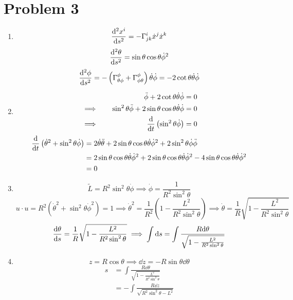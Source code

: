 \documentclass[12pt]{article}
\newcommand{\chrissym}[3]{\Gamma_{#2#3}^#1}
\begin{document}
\section*{Problem 3}
\begin{enumerate}[label=(\alph*)]
    \item 
    \[ \dv[2]{x^i}{s} = -\chrissym{i}{j}{k}\dot{x}^j\dot{x}^k \]
    \[ \dv[2]{\theta}{s} = \sin\theta\cos\theta\dot{\phi}^2 \]
    \[ \dv[2]{\phi}{s} = -\left(\chrissym{\phi}{\theta}{\phi}+\chrissym{\phi}{\phi}{\theta}\right)\dot{\theta}\dot{\phi} = -2\cot\theta\dot{\theta}\dot{\phi} \]
    \item
    \begin{alignat*}{3}
        &         \quad & \ddot{\phi} + 2\cot\theta\dot{\theta}\dot{\phi} &= 0  \\
        &\implies \quad & \sin^2\theta\ddot{\phi} + 2\sin\theta\cos\theta\dot{\theta}\dot{\phi} &= 0 \\
        &\implies \quad & \dv{t}\left(\sin^2\theta\dot{\phi}\right) &= 0 \\
    \end{alignat*}
    \begin{align*}
        \dv{t}\left(\dot{\theta}^2 + \sin^2\theta\dot{\phi}\right) &= 2\dot{\theta}\ddot{\theta} + 2\sin\theta\cos\theta\dot{\theta}\dot{\phi}^2 + 2\sin^2\theta\dot{\phi}\ddot{\phi} \\
        &= 2\sin\theta\cos\theta\dot{\theta}\dot{\phi}^2 + 2\sin\theta\cos\theta\dot{\theta}\dot{\phi}^2 - 4\sin\theta\cos\theta\dot{\theta}\dot{\phi}^2 \\
        &= 0
    \end{align*}
    \item
    \[ \tilde{L} = R^2\sin^2\theta\dot{\phi} \implies \dot{\phi} = \frac{1}{R^2\sin^2\theta} \]
    \[ u\cdot u = R^2\left(\dot{\theta}^2 + \sin^2\theta\dot{\phi}^2\right) = 1 \implies \dot{\theta}^2 = \frac{1}{R^2}\left(1 - \frac{L^2}{R^2\sin^2\theta}\right) \implies \dot{\theta} = \frac{1}{R}\sqrt{1 - \frac{L^2}{R^2\sin^2\theta}} \]
    \[ \dv{\theta}{s} = \frac{1}{R}\sqrt{1 - \frac{L^2}{R^2\sin^2\theta}} \implies \int\dd s = \int \frac{R\dd\theta}{\sqrt{1 - \frac{L^2}{R^2\sin^2\theta}}} \]
    \item
    \[ z = R\cos\theta \implies \dd z = -R\sin\theta\dd\theta \]
    \begin{align*}
        s &= \int \frac{R\dd\theta}{\sqrt{1 - \frac{L^2}{R^2\sin^2\theta}}} \\
        &= -\int\frac{R\dd z}{\sqrt{R^2\sin^2\theta - L^2}} \\

\end{align*}
\end{enumerate}
\end{document}
